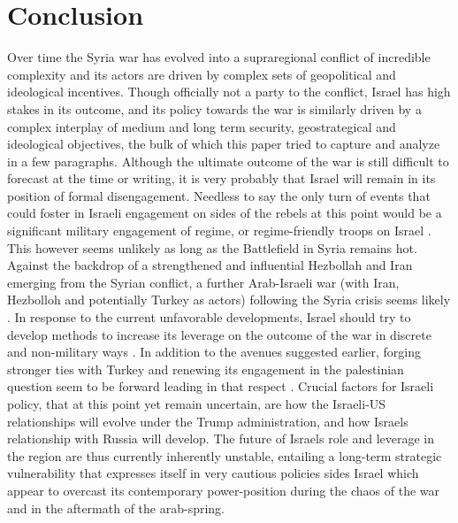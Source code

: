 \documentclass[a4paper]{article}\twocolumn
\begin{document}
\section{Conclusion}
Over time the Syria war has evolved into a supraregional conflict of incredible complexity and its actors are driven by complex sets of geopolitical and ideological incentives. Though officially not a party to the conflict, Israel has high stakes in its outcome, and its policy towards the war is similarly driven by a complex interplay of medium and long term security, geostrategical and ideological objectives, the bulk of which this paper tried to capture and analyze in a few paragraphs. Although the ultimate outcome of the war is still difficult to forecast at the time or writing, it is very probably that Israel will remain in its position of formal disengagement.
Needless to say the only turn of events that could foster in Israeli engagement on sides of the rebels at this point would be a significant military engagement of regime, or regime-friendly troops on Israel \cite{Rabinovich2012}. This however seems unlikely as long as the Battlefield in Syria remains hot. Against the backdrop of a strengthened and influential Hezbollah and Iran emerging from the Syrian conflict, a further Arab-Israeli war (with Iran, Hezbolloh and potentially Turkey as actors) following the Syria crisis seems likely \cite{Rabinovich2012,Hanauer2015,friedman_2016}. In response to the current unfavorable developments, Israel should try to develop methods to increase its leverage on the outcome of the war in discrete and non-military ways \cite{Rabinovich2012}. In addition to the avenues suggested earlier, forging stronger ties with Turkey and renewing its engagement in the palestinian question seem to be forward leading in that respect \cite{Rabinovich2012}. Crucial factors for Israeli policy, that at this point yet remain uncertain, are how the Israeli-US relationships will evolve under the Trump administration, and how Israels relationship with Russia will develop. The future of Israels role and leverage in the region are thus currently inherently unstable, entailing a long-term strategic vulnerability that expresses itself in very cautious policies sides Israel which appear to overcast its contemporary power-position during the chaos of the war and in the aftermath of the arab-spring. 
\FloatBarrier
\end{document}
